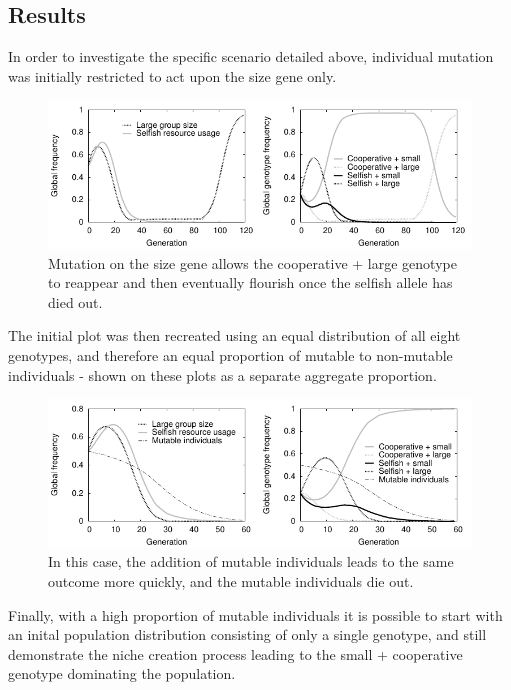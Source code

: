 \documentclass[11pt]{article}
\begin{document}
\subsection{Results}
In order to investigate the specific scenario detailed above, individual mutation was initially restricted to act upon the size gene only.
\vspace{-.5cm}
\begin{figure}[!ht]
  \centering
  \includegraphics{sizeplot.pdf}
  \caption{Mutation on the size gene allows the cooperative + large genotype to reappear and then eventually flourish once the selfish allele has died out.}
  \label{fig:sizeplot}
\end{figure}

The initial plot was then recreated using an equal distribution of all eight genotypes, and therefore an equal proportion of mutable to non-mutable individuals - shown on these plots as a separate aggregate proportion.
\vspace{-.5cm}

\begin{figure}[!ht]
  \centering
  \includegraphics{60geneqmutfix.pdf}
  \caption{In this case, the addition of mutable individuals leads to the same outcome more quickly, and the mutable individuals die out.}
  \label{fig:60geneqmutfix}
\end{figure}

Finally, with a high proportion of mutable individuals it is possible to start with an inital population distribution consisting of only a single genotype, and still demonstrate the niche creation process leading to the small + cooperative genotype dominating the population.
\end{document}
